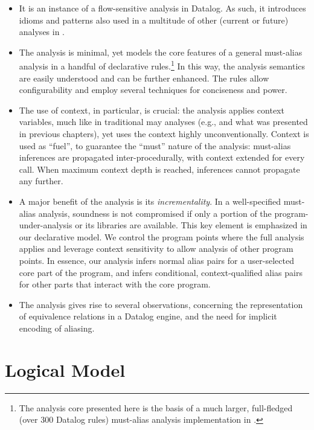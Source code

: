 \begin{itemize}
\item It is an instance of a flow-sensitive analysis in Datalog. As such, it introduces idioms and patterns also used in a multitude of other (current or future) analyses in \doop{}.

\item The analysis is minimal, yet models the core features of a general must-alias analysis in a handful of declarative rules.\footnote{The analysis core presented here is the basis of a much larger, full-fledged (over 300 Datalog rules) must-alias analysis implementation in \doop{}.} In this way, the analysis semantics are easily understood and can be further enhanced. The rules allow configurability and employ several techniques for conciseness and power.

\item The use of context, in particular, is crucial: the analysis applies context variables, much like in traditional may analyses (e.g., \cite{pldi:2013:Kastrinis,article:2015:Smaragdakis} and what was presented in previous chapters), yet uses the context highly unconventionally. Context is used as ``fuel'', to guarantee the ``must'' nature of the analysis: must-alias inferences are propagated inter-procedurally, with context extended for every call. When maximum context depth is reached, inferences cannot propagate any further.

\item A major benefit of the analysis is its \emph{incrementality}. In a well-specified must-alias analysis, soundness is not compromised if only a portion of the program-under-analysis or its libraries are available. This key element is emphasized in our declarative model. We control the program points where the full analysis applies and leverage context sensitivity to allow analysis of other program points. In essence, our analysis infers normal alias pairs for a user-selected core part of the program, and infers conditional, context-qualified alias pairs for other parts that interact with the core program.

\item The analysis gives rise to several observations, concerning the representation of equivalence relations in a Datalog engine, and the need for implicit encoding of aliasing.

\end{itemize}


\section{Logical Model}
\label{sec:must-logic:model}

